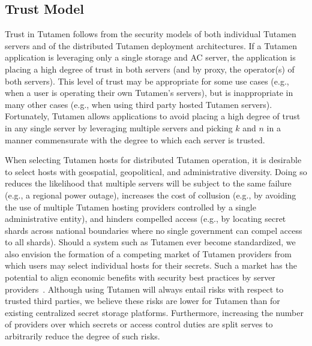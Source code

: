 \subsection{Trust Model}

Trust in Tutamen follows from the security models of both individual
Tutamen servers and of the distributed Tutamen deployment
architectures. If a Tutamen application is leveraging only a single
storage and AC server, the application is placing a high degree of
trust in both servers (and by proxy, the operator(s) of both
servers). This level of trust may be appropriate for some use cases
(e.g., when a user is operating their own Tutamen's servers), but is
inappropriate in many other cases (e.g., when using third party hosted
Tutamen servers). Fortunately, Tutamen allows applications to avoid
placing a high degree of trust in any single server by leveraging
multiple servers and picking $k$ and $n$ in a manner commensurate with
the degree to which each server is trusted.

When selecting Tutamen hosts for distributed Tutamen operation, it is
desirable to select hosts with geospatial, geopolitical, and
administrative diversity. Doing so reduces the likelihood that
multiple servers will be subject to the same failure (e.g., a regional
power outage), increases the cost of collusion (e.g., by avoiding the
use of multiple Tutamen hosting providers controlled by a single
administrative entity), and hinders compelled access (e.g., by
locating secret shards across national boundaries where no single
government can compel access to all shards). Should a system such as
Tutamen ever become standardized, we also envision the formation of a
competing market of Tutamen providers from which users may select
individual hosts for their secrets. Such a market has the potential to
align economic benefits with security best practices by server
providers~\cite{sayler-trust, sayler-phd}. Although using Tutamen will
always entail risks with respect to trusted third parties, we believe
these risks are lower for Tutamen than for existing centralized secret
storage platforms. Furthermore, increasing the number of providers
over which secrets or access control duties are split serves to
arbitrarily reduce the degree of such risks.

